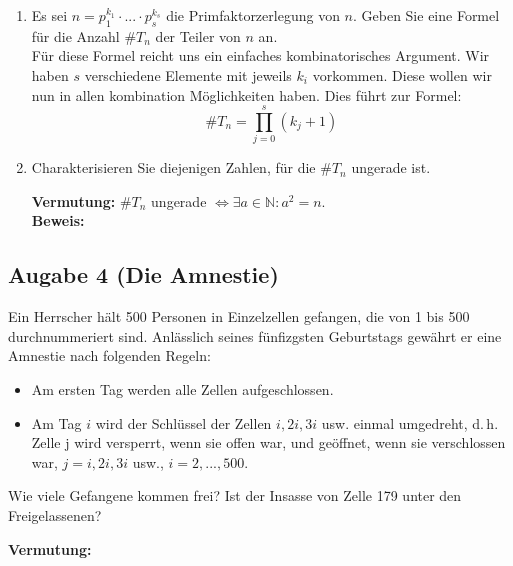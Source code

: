 \documentclass[11pt,a4paper,ngerman]{article}
\newcommand{\N}{\mathbb{N}}
\begin{document}
\begin{enumerate}[\bfseries a)]

\item Es sei $n = p_{1}^{k_1} \cdot ... \cdot p_{s}^{k_s}$ die Primfaktorzerlegung von $n$. Geben Sie eine Formel für die Anzahl $\#T_n$ der Teiler von $n$ an.\\



Für diese Formel reicht uns ein einfaches kombinatorisches Argument. Wir haben $s$ verschiedene Elemente mit jeweils $k_i$ vorkommen. Diese wollen wir nun in allen kombination Möglichkeiten haben. Dies führt zur Formel:
$$\#T_n = \prod_{j=0}^{s} ( k_j + 1)$$

\item Charakterisieren Sie diejenigen Zahlen, für die $\#T_n$ ungerade ist.



\textbf{Vermutung:} $\#T_n$ ungerade $\Leftrightarrow \exists a\in \N : a^2 = n$.\\
\textbf{Beweis:}\\


\end{enumerate}




\subsection*{Augabe 4 (Die Amnestie)}

Ein Herrscher hält 500 Personen in Einzelzellen gefangen, die von 1 bis 500 durchnummeriert sind. Anlässlich seines fünfizgsten Geburtstags gewährt er eine Amnestie nach folgenden Regeln:

\begin{itemize}

\item Am ersten Tag werden alle Zellen aufgeschlossen.

\item Am Tag $i$ wird der Schlüssel der Zellen $i, 2i, 3i$ usw. einmal umgedreht, d.\,h. Zelle j wird versperrt, wenn sie offen war, und geöffnet, wenn sie verschlossen war, $j = i, 2i, 3i$ usw., $i = 2, ... , 500$.

\end{itemize}

Wie viele Gefangene kommen frei? Ist der Insasse von Zelle 179 unter den Freigelassenen?

\vspace{30px}
\textbf{Vermutung:} 
\end{document}
